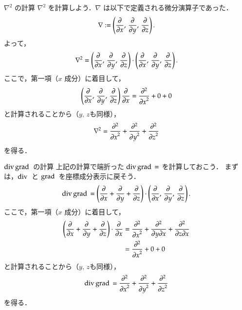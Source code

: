             \begin{memo}{${\nabla}^{2}$ の計算}
                ${\nabla}^{2}$ を計算しよう．$\nabla$ は以下で定義される微分演算子であった．
                \begin{equation*}
                    {\nabla} := \left(\frac{\partial}{\partial x} ,\, \frac{\partial}{\partial y} ,\, \frac{\partial}{\partial z}\right).
                \end{equation*}
                よって，
                \begin{equation*}
                    {\nabla}^{2} = \left(\frac{\partial}{\partial x} ,\, \frac{\partial}{\partial y} ,\, \frac{\partial}{\partial z}\right)
                                   \cdot
                                   \left(\frac{\partial}{\partial x} ,\, \frac{\partial}{\partial y} ,\, \frac{\partial}{\partial z}\right).
                \end{equation*}
                ここで，第一項（$x$ 成分）に着目して，
                \begin{equation*}
                    \left(\frac{\partial}{\partial x} ,\, \frac{\partial}{\partial y} ,\, \frac{\partial}{\partial z}\right) \frac{\partial}{\partial x}
                    = \frac{{\partial}^{2}}{{\partial x}^{2}} + 0 + 0
                \end{equation*}
                と計算されることから（$y,\,z$も同様），
                \begin{equation*}
                    {\nabla}^{2} = \frac{{\partial}^{2}}{{\partial x}^{2}} + \frac{{\partial}^{2}}{{\partial y}^{2}} +  \frac{{\partial}^{2}}{{\partial z}^{2}}
                \end{equation*}
                を得る．
            \end{memo}

            \begin{memo}{$\mathrm{div}\, \mathrm{grad}\,$ の計算}
                上記の計算で端折った $\mathrm{div}\, \mathrm{grad}\, = $ を計算しておこう．
                まずは，$\mathrm{div}\,$ と $\mathrm{grad}\,$ を座標成分表示に戻そう．
                \begin{align*}
                    \mathrm{div}\, \mathrm{grad}\, = \left(\frac{\partial}{\partial x} + \frac{\partial}{\partial y} + \frac{\partial}{\partial z}\right)
                                       \cdot  \left(\frac{\partial}{\partial x} ,\, \frac{\partial}{\partial y} ,\, \frac{\partial}{\partial z}\right) .
                \end{align*}
                ここで，第一項（$x$ 成分）に着目して，
                \begin{align*}
                     \left(\frac{\partial}{\partial x} + \frac{\partial}{\partial y} + \frac{\partial}{\partial z}\right) \cdot \frac{\partial}{\partial x}
                     &= \frac{{\partial}^{2} }{{\partial x}^{2}} + \frac{{\partial}^{2}}{\partial y \partial x} + \frac{{\partial}^{2}}{\partial z \partial x} \\
                     &= \frac{{\partial}^{2}}{{\partial x}^{2}} + 0 + 0
                \end{align*}
                と計算されることから（$y,\,z$も同様），
                \begin{align*}
                    \mathrm{div}\, \mathrm{grad}\,  = \frac{{\partial}^{2}}{{\partial x}^{2}} + \frac{{\partial}^{2}}{{\partial y}^{2}} +  \frac{{\partial}^{2}}{{\partial z}^{2}}
                \end{align*}
                を得る．
            \end{memo}

